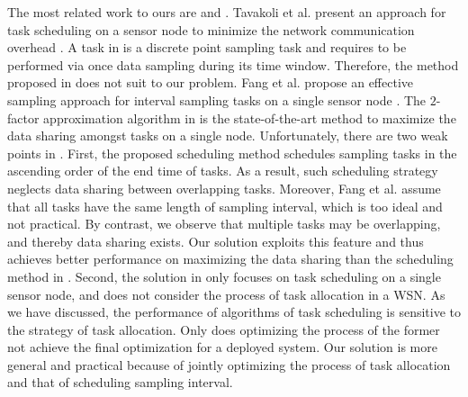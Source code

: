 \documentclass[prodmode,acmtosn]{acmsmall}
\begin{document}
The most related work to ours are \cite{2010task_optimization} and \cite{2013fang}. Tavakoli et al. present an approach for task scheduling on a sensor node to minimize the network communication overhead \cite{2010task_optimization}. A task in \cite{2010task_optimization} is a discrete point sampling task and requires to be performed via once data sampling during its time window. Therefore, the method proposed in \cite{2010task_optimization} does not suit to our problem.  Fang et al.  propose an effective sampling approach for interval sampling tasks on a single sensor node \cite{2013fang}. The $2$-factor approximation algorithm in \cite{2013fang} is the state-of-the-art method to maximize the data sharing amongst tasks on a single node. Unfortunately, there are two weak points in \cite{2013fang}. First, the proposed scheduling method schedules sampling tasks in the ascending order of the end time of tasks. As a result, such scheduling strategy neglects data sharing between overlapping tasks. Moreover, Fang et al. assume that all tasks have the same length of sampling interval, which is too ideal and not practical. By contrast, we observe that multiple tasks may be overlapping, and thereby data sharing exists. Our solution exploits this feature and thus achieves better performance on maximizing the data sharing than the scheduling method in \cite{2013fang}. Second, the solution in \cite{2013fang} only focuses on task scheduling on a single sensor node, and does not consider the process of task allocation in a WSN. As we have discussed, the performance of algorithms of task scheduling is sensitive to the strategy of task allocation. Only does optimizing the process of the former not achieve the final optimization for a deployed system. Our solution is more general and practical because of jointly optimizing the process of task allocation and that of scheduling sampling interval.
\end{document}

